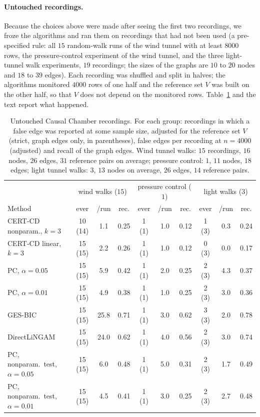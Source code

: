 \paragraph{Untouched recordings.} Because the choices above were made after seeing
the first two recordings, we froze the algorithms and ran them on recordings that
had not been used (a pre-specified rule: all $15$ random-walk runs of the wind
tunnel with at least $8000$ rows, the pressure-control experiment of the wind
tunnel, and the three light-tunnel walk experiments, $19$ recordings; the
sizes of the graphs are $10$ to $20$ nodes and $18$ to $39$ edges). Each recording
was shuffled and split in halves; the algorithms monitored $4000$ rows of one half
and the reference set $V$ was built on the other half, so that $V$ does not depend on the
monitored rows. Table~\ref{tab:fresh} and the text report what happened.

\begin{table}[t]
\caption{Untouched Causal Chamber recordings. For each group: recordings in which a false
edge was reported at some sample size, adjusted for the reference set $V$ (strict, graph
edges only, in parentheses), false edges per recording at $n=4000$ (adjusted) and recall of
the graph edges. Wind tunnel walks: $15$ recordings, $16$ nodes, $26$ edges, $31$ reference
pairs on average; pressure control: $1$, $11$ nodes, $18$ edges; light tunnel walks: $3$,
$13$ nodes on average, $26$ edges, $14$ reference pairs.}\label{tab:fresh}
\footnotesize
\setlength{\tabcolsep}{2pt}
\begin{tabular}{@{}lccccccccc@{}}
\toprule
 & \multicolumn{3}{c}{wind walks ($15$)} & \multicolumn{3}{c}{pressure control ($1$)} & \multicolumn{3}{c}{light walks ($3$)}\\
Method & ever & /run & rec. & ever & /run & rec. & ever & /run & rec.\\
\midrule
CERT-CD nonparam., $k=3$ & 10 (14) & 1.1 & 0.25 & 1 (1) & 1.0 & 0.12 & 1 (3) & 0.3 & 0.24 \\
CERT-CD linear, $k=3$ & 15 (15) & 2.2 & 0.26 & 1 (1) & 1.0 & 0.12 & 0 (3) & 0.0 & 0.17 \\
PC, $\alpha=0.05$ & 15 (15) & 5.9 & 0.42 & 1 (1) & 2.0 & 0.25 & 2 (3) & 4.3 & 0.37 \\
PC, $\alpha=0.01$ & 15 (15) & 4.9 & 0.38 & 1 (1) & 1.0 & 0.25 & 2 (3) & 3.0 & 0.36 \\
GES-BIC & 15 (15) & 25.8 & 0.71 & 1 (1) & 3.0 & 0.62 & 3 (3) & 2.0 & 0.78 \\
DirectLiNGAM & 15 (15) & 24.0 & 0.62 & 1 (1) & 4.0 & 0.56 & 2 (3) & 3.0 & 0.74 \\
PC, nonparam.\ test, $\alpha=0.05$ & 15 (15) & 6.0 & 0.48 & 1 (1) & 5.0 & 0.31 & 2 (3) & 1.7 & 0.49 \\
PC, nonparam.\ test, $\alpha=0.01$ & 15 (15) & 4.5 & 0.41 & 1 (1) & 3.0 & 0.25 & 2 (3) & 2.7 & 0.48 \\
\bottomrule
\end{tabular}
\end{table}

